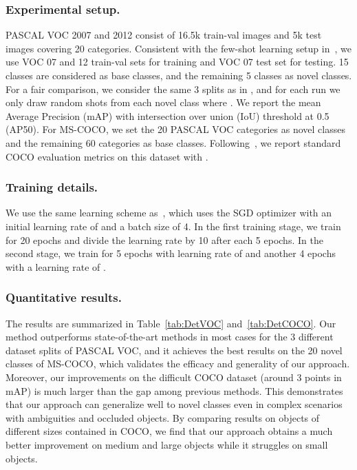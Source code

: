 \documentclass[runningheads]{llncs}
\begin{document}
\subsubsection{Experimental setup.}


PASCAL VOC 2007 and 2012 consist of 16.5k train-val images and 5k test images covering 20 categories.
Consistent with the few-shot learning setup in~\cite{YOLO-FS2019,MetaDet2019,metarcnn2019}, we use VOC 07 and 12 train-val sets for training and VOC 07 test set for testing. 15 classes are considered as base classes, and the remaining 5 classes as novel classes. For a fair comparison, we consider the same 3 splits as in \cite{YOLO-FS2019,MetaDet2019,metarcnn2019,wang2020few}, and for each run we only draw  random shots from each novel class where .
We report the mean Average Precision (mAP) with intersection over union (IoU) threshold at 0.5 (AP50).
For MS-COCO, we set the 20 PASCAL VOC categories as novel classes and the remaining 60 categories as base classes.
Following~\cite{Liu2016SSDSS,renNIPS15fasterrcnn}, we report standard COCO evaluation metrics on this dataset with .


\subsubsection{Training details.}
We use the same learning scheme as~\cite{metarcnn2019}, which uses the SGD optimizer with an initial learning rate of  and a batch size of 4. 
In the first training stage, we train for 20 epochs and divide the learning rate by 10 after each 5 epochs. In the second stage, we train for 5 epochs with learning rate of  and another 4 epochs with a learning rate of .


\subsubsection{Quantitative results.}
The results are summarized in Table~\ref{tab:DetVOC} and~\ref{tab:DetCOCO}.
Our method outperforms state-of-the-art methods in most cases for the 3 different dataset splits of PASCAL VOC, and it achieves the best results on the 20 novel classes of MS-COCO, which validates the efficacy and generality of our approach.
Moreover, our improvements on the difficult COCO dataset (around 3 points in mAP) is much larger than the gap among previous methods. This demonstrates that our approach can generalize well to novel classes even in complex scenarios with ambiguities and occluded objects.
By comparing results on objects of different sizes contained in COCO, we find that our approach obtains a much better improvement on medium and large objects while it struggles on small objects. 
\end{document}
